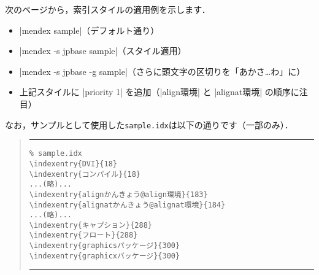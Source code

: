 \documentclass[a4paper]{jsarticle}
\newcommand{\FileName}[1]{\texttt{#1}}
\begin{document}
次のページから，索引スタイルの適用例を示します．
\begin{itemize}
 \item |mendex sample|（デフォルト通り）
 \item |mendex -s jpbase sample|（スタイル適用）
 \item |mendex -s jpbase -g sample|（さらに頭文字の区切りを「あかさ…わ」に）
 \item 上記スタイルに |priority 1| を追加（|align環境| と |alignat環境| の順序に注目）
\end{itemize}
なお，サンプルとして使用した\FileName{sample.idx}は以下の通りです（一部のみ）．
\begin{quote}
\hrule\vskip10pt\noautospacing\noautoxspacing
\begin{verbatim}
% sample.idx
\indexentry{DVI}{18}
\indexentry{コンパイル}{18}
...(略)...
\indexentry{alignかんきょう@align環境}{183}
\indexentry{alignatかんきょう@alignat環境}{184}
...(略)...
\indexentry{キャプション}{288}
\indexentry{フロート}{288}
\indexentry{graphicsパッケージ}{300}
\indexentry{graphicxパッケージ}{300}
\end{verbatim}
\vskip10pt\hrule
\end{quote}

\def\indexname{索引（\texttt{mendex}デフォルト）}
\def\indexname{索引（\texttt{mendex -s jpbase}）}
\def\indexname{索引（\texttt{mendex -s jpbase -g}）}
\def\indexname{索引（スタイルに\texttt{priority 1}を追加）}
\end{document}
